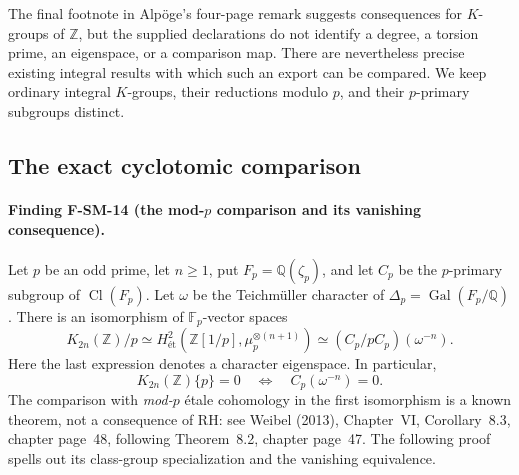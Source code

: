 \documentclass[11pt,a4paper]{article}
\theoremstyle{definition}\newtheorem{definition}[theorem]{Definition}
\theoremstyle{remark}\newtheorem{remark}[theorem]{Remark}
\begin{document}
The final footnote in Alp\"oge's four-page remark suggests consequences for
$K$-groups of $\mathbb Z$, but the supplied declarations do not identify a
degree, a torsion prime, an eigenspace, or a comparison map.  There are
nevertheless precise existing integral results with which such an export
can be compared.  We keep ordinary integral $K$-groups, their reductions
modulo $p$, and their $p$-primary subgroups distinct.

\subsection{The exact cyclotomic comparison}

\paragraph{Finding F-SM-14 (the mod-$p$ comparison and its vanishing consequence).}
Let $p$ be an odd prime, let $n\geq1$, put
$F_p=\mathbb Q(\zeta_p)$, and let $C_p$ be the $p$-primary subgroup of
$\operatorname{Cl}(F_p)$.  Let $\omega$ be the Teichm\"uller character of
$\Delta_p=\operatorname{Gal}(F_p/\mathbb Q)$.  There is an isomorphism of
$\mathbb F_p$-vector spaces
\begin{equation}\label{eq:SM-Kclass}
 K_{2n}(\mathbb Z)/p
 \simeq H^2_{\text{ét}}
       (\mathbb Z[1/p],\mu_p^{\otimes(n+1)})
 \simeq (C_p/pC_p)(\omega^{-n}).
\end{equation}
Here the last expression denotes a character eigenspace.  In particular,
\[
 K_{2n}(\mathbb Z)\{p\}=0
 \quad\Longleftrightarrow\quad C_p(\omega^{-n})=0.
\]
The comparison with \emph{mod-$p$} \'etale cohomology in the first
isomorphism is a known theorem, not a consequence of RH: see Weibel
(2013), Chapter~VI, Corollary~8.3, chapter page~48, following
Theorem~8.2, chapter page~47.  The following proof spells out its
class-group specialization and the vanishing equivalence.
\end{document}
